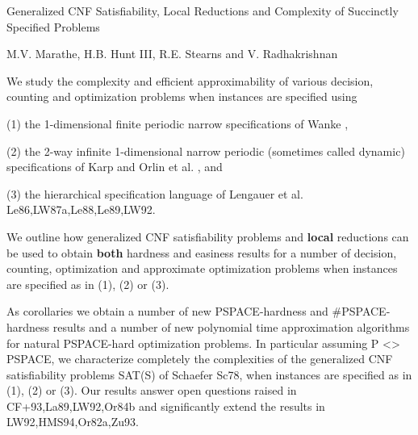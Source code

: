 
        Generalized CNF Satisfiability, Local Reductions and 
            Complexity of  Succinctly Specified Problems

M.V. Marathe, H.B. Hunt III, R.E. Stearns and V. Radhakrishnan


We study the complexity and efficient approximability of various decision,
counting and optimization problems when instances are specified using 

(1) the 1-dimensional finite periodic narrow specifications of 
Wanke \cite{Wa93}, 

(2) the 2-way infinite 1-dimensional narrow
periodic (sometimes called dynamic) specifications 
of Karp and Orlin  et al. \cite{KMW67,Or82a},  and 


(3) the hierarchical specification language of Lengauer et al. 
Le86,LW87a,Le88,Le89,LW92.



We outline how  
generalized CNF satisfiability problems 
and {\bf local} reductions
can be used to obtain {\bf both} hardness and easiness results for
a number of decision, counting, optimization and approximate optimization
problems when instances are specified as in (1), (2) or (3). 

As corollaries we obtain a number of new
PSPACE-hardness and  #PSPACE-hardness results
and  a number of new
polynomial time approximation algorithms for natural PSPACE-hard 
optimization problems. In particular assuming P <> PSPACE, 
we characterize
completely the complexities of the generalized CNF satisfiability problems
SAT(S) of Schaefer Sc78, when instances are specified
as in (1), (2) or (3).
Our results answer  open questions raised in  CF+93,La89,LW92,Or84b
and significantly extend the results in LW92,HMS94,Or82a,Zu93.


